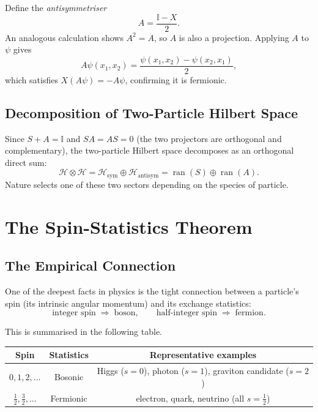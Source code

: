 \documentclass[11pt,a4paper]{article}
\newcommand{\id}{\mathbb{I}}
\newcommand{\hilb}{\mathcal{H}}
\begin{document}
Define the \emph{antisymmetriser}
\[
  A = \frac{\id - X}{2}.
\]
An analogous calculation shows $A^2 = A$, so $A$ is also a projection.
Applying $A$ to $\psi$ gives
\[
  A\psi(x_1,x_2) = \frac{\psi(x_1,x_2)-\psi(x_2,x_1)}{2},
\]
which satisfies $X(A\psi) = -A\psi$, confirming it is fermionic.

\subsection{Decomposition of Two-Particle Hilbert Space}

Since $S + A = \id$ and $SA = AS = 0$ (the two projectors are orthogonal and
complementary), the two-particle Hilbert space decomposes as an orthogonal
direct sum:
\[
  \hilb \otimes \hilb
  = \hilb_{\mathrm{sym}} \oplus \hilb_{\mathrm{antisym}}
  = \operatorname{ran}(S) \oplus \operatorname{ran}(A).
\]
Nature selects one of these two sectors depending on the species of particle.

\section{The Spin-Statistics Theorem}

\subsection{The Empirical Connection}

One of the deepest facts in physics is the tight connection between a particle's
spin (its intrinsic angular momentum) and its exchange statistics:
\[
  \text{integer spin} \;\Longrightarrow\; \text{boson},
  \qquad
  \text{half-integer spin} \;\Longrightarrow\; \text{fermion}.
\]

This is summarised in the following table.

\begin{center}
\renewcommand{\arraystretch}{1.3}
\begin{tabular}{ccc}
  \toprule
  Spin & Statistics & Representative examples \\
  \midrule
  $0, 1, 2, \ldots$               & Bosonic   & Higgs ($s=0$), photon ($s=1$), graviton candidate ($s=2$) \\
  $\tfrac{1}{2}, \tfrac{3}{2}, \ldots$ & Fermionic & electron, quark, neutrino (all $s=\tfrac{1}{2}$) \\
  \bottomrule
\end{tabular}
\end{center}
\end{document}
